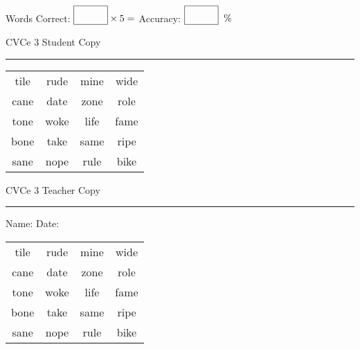\documentclass{memoir}
\begin{document}
\small

Words Correct: $\fbox{\phantom{\huge 100}} \times 5 = $ Accuracy: $\fbox{\phantom{\huge 100}}\;\; \%$ 

\vfill

\newpage


\footnotesize \noindent
CVCe 3 \hfill Student Copy
\smallskip
\hrule

\Large

\setlength{\tabcolsep}{14pt}
\def\arraystretch{2}

{\selectfont


\begin{vplace}[0.5]
\begin{center}
\begin{tabular}{cccc}
tile & rude & mine & wide \\
cane & date & zone & role \\
tone & woke & life & fame \\
bone & take & same & ripe \\
sane & nope & rule & bike \\
\end{tabular}
\end{center}
\end{vplace}

}

\newpage

\footnotesize \noindent
CVCe 3 \hfill Teacher Copy
\smallskip
\hrule

\small

\vfill

\noindent
Name: \underline{\hspace{1.75in}} \hfill Date: \underline{\hspace{1in}}

\Large

{\selectfont


\begin{vplace}[0.5]
\begin{center}
\begin{tabular}{cccc}
tile & rude & mine & wide \\
cane & date & zone & role \\
tone & woke & life & fame \\
bone & take & same & ripe \\
sane & nope & rule & bike \\
\end{tabular}
\end{center}
\end{vplace}



}
\end{document}
